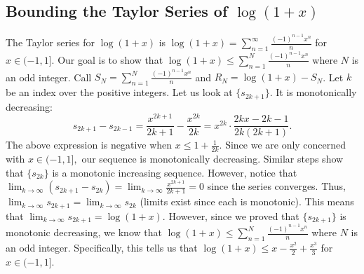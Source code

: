 \documentclass{article}
\begin{document}
    \subsection{Bounding the Taylor Series of $\log(1+x)$}
The Taylor series for $\log(1+x)$ is $\log(1+x) = \sum_{n=1}^\infty \frac{(-1)^{n-1}x^n}{n}$ for $x \in (-1, 1]$. Our goal is to show that $\log(1+x)\leq \sum_{n=1}^N \frac{(-1)^{n-1}x^n}{n}$ where $N$ is an odd integer. Call $S_N = \sum_{n=1}^N \frac{(-1)^{n-1}x^n}{n}$ and $R_N = \log(1+x)-S_N$. Let $k$ be an index over the positive integers. Let us look at $\{s_{2k+1}\}$. It is monotonically decreasing: 
$$s_{2k+1}-s_{2k-1} = \frac{x^{2k+1}}{2k+1}-\frac{x^{2k}}{2k}=x^{2k}\cdot \frac{2kx-2k-1}{2k(2k+1)}.$$The above expression is negative when $x\leq 1+\frac{1}{2k}.$ Since we are only concerned with $x \in (-1,1],$ our sequence is monotonically decreasing. Similar steps show that $\{s_{2k}\}$ is a monotonic increasing sequence. However, notice that $\lim_{k \to \infty} (s_{2k+1}-s_{2k}) = \lim_{k \to \infty} \frac{x^{2k+1}}{2k+1}=0$ since the series converges. Thus, $\lim_{k \to \infty} s_{2k+1} = \lim_{k \to \infty} s_{2k}$ (limits exist since each is monotonic). This means that $\lim_{k \to \infty} s_{2k+1}=\log(1+x).$ However, since we proved that $\{s_{2k+1}\}$ is monotonic decreasing, we know that $\log(1+x) \leq \sum_{n=1}^N \frac{(-1)^{n-1}x^n}{n}$ where $N$ is an odd integer. Specifically, this tells us that $\log(1+x)\leq x-\frac{x^2}{2}+\frac{x^3}{3}$ for $x \in (-1,1]$. 

\newpage


\end{document}

